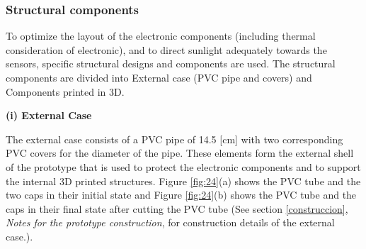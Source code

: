 \documentclass[12pt,letterpaper]{article}
\numberwithin{figure}{section}
\numberwithin{equation}{section}
\numberwithin{table}{section}
\begin{document}
\subsubsection{Structural components}

To optimize the layout of the electronic components (including thermal consideration of electronic), and to direct sunlight adequately towards the sensors, specific structural designs and components are used. The structural components are divided into External case (PVC pipe and covers) and Components printed in 3D.

 \begin{flushleft}
 \textbf{(i) External Case}
 \end{flushleft}


The external case consists of a PVC pipe of 14.5 [cm] with two corresponding PVC covers for the diameter of the pipe. These elements form the external shell of the prototype that is used to protect the electronic components and to support the internal 3D printed structures. Figure \ref{fig:24}(a) shows the PVC tube and the two caps in their initial state and Figure \ref{fig:24}(b) shows the PVC tube and the caps in their final state after cutting the PVC tube (See section \ref{construccion}, \textit{Notes for the prototype construction}, for construction details of the external case.). 
\end{document}
